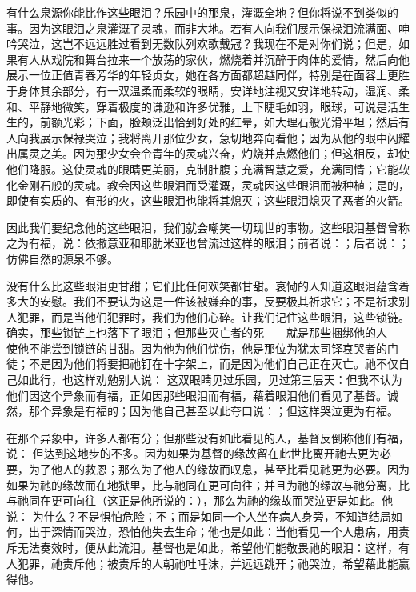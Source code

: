 有什么泉源你能比作这些眼泪？乐园中的那泉，灌溉全地？但你将说不到类似的事。因为这眼泪之泉灌溉了灵魂，而非大地。若有人向我们展示保禄泪流满面、呻吟哭泣，这岂不远远胜过看到无数队列欢歌戴冠？我现在不是对你们说；但是，如果有人从戏院和舞台拉来一个放荡的家伙，燃烧着并沉醉于肉体的爱情，然后向他展示一位正值青春芳华的年轻贞女，她在各方面都超越同伴，特别是在面容上更胜于身体其余部分，有一双温柔而柔软的眼睛，安详地注视又安详地转动，湿润、柔和、平静地微笑，穿着极度的谦逊和许多优雅，上下睫毛如羽，眼球，可说是活生生的，前额光彩；下面，脸颊泛出恰到好处的红晕，如大理石般光滑平坦；然后有人向我展示保禄哭泣；我将离开那位少女，急切地奔向看他；因为从他的眼中闪耀出属灵之美。因为那少女会令青年的灵魂兴奋，灼烧并点燃他们；但这相反，却使他们降服。这使灵魂的眼睛更美丽，克制肚腹；充满智慧之爱，充满同情；它能软化金刚石般的灵魂。教会因这些眼泪而受灌溉，灵魂因这些眼泪而被种植；是的，即使有实质的、有形的火，这些眼泪也能将其熄灭；这些眼泪熄灭了恶者的火箭。\par

因此我们要纪念他的这些眼泪，我们就会嘲笑一切现世的事物。这些眼泪基督曾称之为有福，说：依撒意亚和耶肋米亚也曾流过这样的眼泪；前者说：；后者说：；仿佛自然的源泉不够。\par

没有什么比这些眼泪更甘甜；它们比任何欢笑都甘甜。哀恸的人知道这眼泪蕴含着多大的安慰。我们不要认为这是一件该被嫌弃的事，反要极其祈求它；不是祈求别人犯罪，而是当他们犯罪时，我们为他们心碎。让我们记住这些眼泪，这些锁链。确实，那些锁链上也落下了眼泪；但那些灭亡者的死——就是那些捆绑他的人——使他不能尝到锁链的甘甜。因为他为他们忧伤，他是那位为犹太司铎哀哭者的门徒；不是因为他们将要把祂钉在十字架上，而是因为他们自己正在灭亡。祂不仅自己如此行，也这样劝勉别人说： 这双眼睛见过乐园，见过第三层天：但我不认为他们因这个异象而有福，正如因那些眼泪而有福，藉着眼泪他们看见了基督。诚然，那个异象是有福的；因为他自己甚至以此夸口说：；但这样哭泣更为有福。\par

在那个异象中，许多人都有分；但那些没有如此看见的人，基督反倒称他们有福，说： 但达到这地步的不多。因为如果为基督的缘故留在此世比离开祂去更为必要，为了他人的救恩；那么为了他人的缘故而叹息，甚至比看见祂更为必要。因为如果为祂的缘故而在地狱里，比与祂同在更可向往；并且为祂的缘故与祂分离，比与祂同在更可向往（这正是他所说的：），那么为祂的缘故而哭泣更是如此。他说： 为什么？不是惧怕危险；不；而是如同一个人坐在病人身旁，不知道结局如何，出于深情而哭泣，恐怕他失去生命；他也是如此：当他看见一个人患病，用责斥无法奏效时，便从此流泪。基督也是如此，希望他们能敬畏祂的眼泪：这样，有人犯罪，祂责斥他；被责斥的人朝祂吐唾沫，并远远跳开；祂哭泣，希望藉此能赢得他。\par

